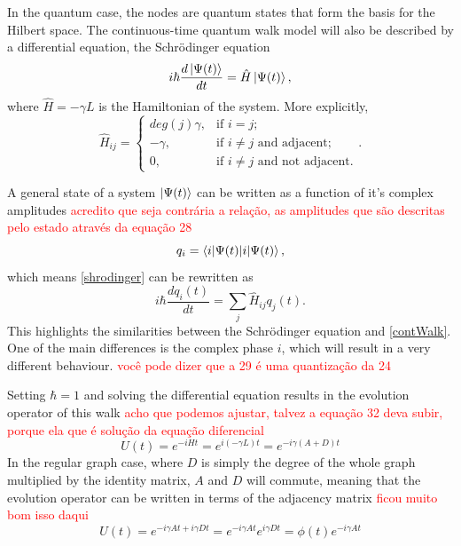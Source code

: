 \documentclass[../../dissertation.tex]{subfiles}
\begin{document}
In the quantum case, the nodes are quantum states that form the basis for the Hilbert space. The continuous-time quantum walk model will also be described by a differential equation, the Schrödinger equation
\begin{equation}
	i\hbar \frac{d\ket{\Psi(t)}}{dt} = \hat{H} \ket{\Psi(t)}, \label{shrodinger}
\end{equation}
where $\hat{H} = -\gamma L$ is the Hamiltonian of the system. More explicitly,
\begin{equation}
	\hat{H}_{ij} = \begin{cases} 
		deg(j)\gamma, & \mbox{if } i= j; \\ 
		-\gamma, & \mbox{if } i\neq j\mbox{ and adjacent};\\
		0, & \mbox{if } i\neq j\mbox{ and not adjacent}.
	\end{cases}.
	\label{Hamilt}
\end{equation}\par
A general state of a system $\ket{\Psi(t)}$ can be written as a function of it's complex amplitudes \textcolor{red}{acredito que seja contrária a relação, as amplitudes que são descritas pelo estado através da equação 28}
\begin{equation}
	q_i = \braket{i|\Psi(t)},
\end{equation}
which means \ref{shrodinger} can be rewritten as 
\begin{equation}
	i\hbar \frac{dq_i(t)}{dt} = \sum_j \hat{H}_{ij} q_j(t).
\end{equation}
This highlights the similarities between the Schrödinger equation and \ref{contWalk}. One of the main differences is the complex phase $i$, which will result in a very different behaviour. \textcolor{red}{você pode dizer que a 29 é uma quantização da 24}\par
Setting $\hbar = 1$ and solving the differential equation results in the evolution operator of this walk \textcolor{red}{acho que podemos ajustar, talvez a equação 32 deva subir, porque ela que é solução da equação diferencial}%
\begin{equation}
	U(t) = e^{-iHt} = e^{i(-\gamma L)t} = e^{-i\gamma(A+D)t}
\end{equation}
In the regular graph case, where $D$ is simply the degree of the whole graph multiplied by the identity matrix, $A$ and $D$ will commute, meaning that the evolution operator can be written in terms of the adjacency matrix \textcolor{red}{ficou muito bom isso daqui}
\begin{equation}
	U(t) = e^{-i\gamma A t + i\gamma D t} = e^{-i\gamma A t} e^{i\gamma D t} = \phi(t) e^{-i\gamma A t} 
\end{equation}
\end{document}
